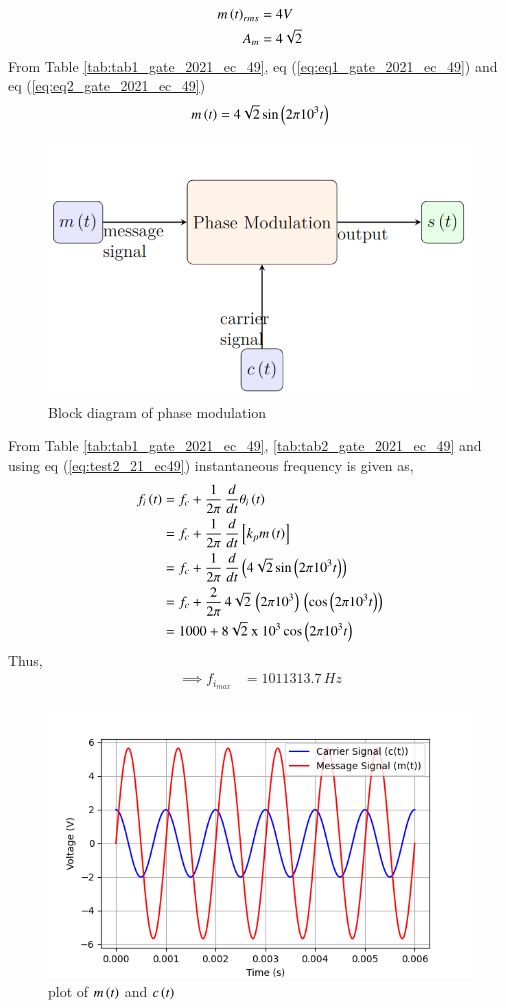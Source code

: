 \documentclass[journal,12pt,twocolumn]{IEEEtran}
\begin{document}
\begin{align}
    m\left(t\right)_{rms} &= 4V \label{eq:eq1_gate_2021_ec_49} \\
    A_m &= 4\sqrt{2} \label{eq:eq2_gate_2021_ec_49}
\end{align}
From Table \ref{tab:tab1_gate_2021_ec_49}, eq (\ref{eq:eq1_gate_2021_ec_49}) and eq (\ref{eq:eq2_gate_2021_ec_49})
\begin{align}
     m\left(t\right) &= 4\sqrt{2}\sin \left(2 \pi 10^3 t\right)\\
\end{align}

\begin{figure}[ht]
    \centering
    \includegraphics[width=\columnwidth]{figs/fig2.png}
    \caption{Block diagram of phase modulation}
    \label{fig:fig1_gate_2021_ec_49}  
\end{figure}
From Table \ref{tab:tab1_gate_2021_ec_49}, \ref{tab:tab2_gate_2021_ec_49} and using eq (\ref{eq:test2_21_ec49}) instantaneous frequency is given as,
\begin{align}
    f_i\left(t\right) &= f_c + \frac{1}{2\pi}\, \frac{d}{dt}\theta_i\left(t\right)\\
    &= f_c + \frac{1}{2\pi}\, \frac{d}{dt}{}\left[k_p m\left(t\right)\right]\\
    &= f_c + \frac{1}{2\pi}\, \frac{d}{dt}\left(4\sqrt{2}\sin \left(2 \pi 10^3 t\right)\right)\\
    &= f_c + \frac{2}{2\pi}\, 4\sqrt{2}\, \left(2\pi 10^3\right)\, \left(\cos \left(2 \pi 10^3 t\right)\right)\\
    &= 1000 + 8\sqrt{2} \text{ x } 10^3 \cos \left(2\pi 10^3 t\right)
\end{align}
Thus,
\begin{align}
    \implies f_{i_{max}} &= 1011313.7 \, Hz
\end{align}

\begin{figure}[ht]
    \centering
        \includegraphics[width=\columnwidth]{figs/Figure_1.png}
    \caption{plot of $m\left(t\right)$ and $c\left(t\right)$}
\end{figure}
\end{document}

